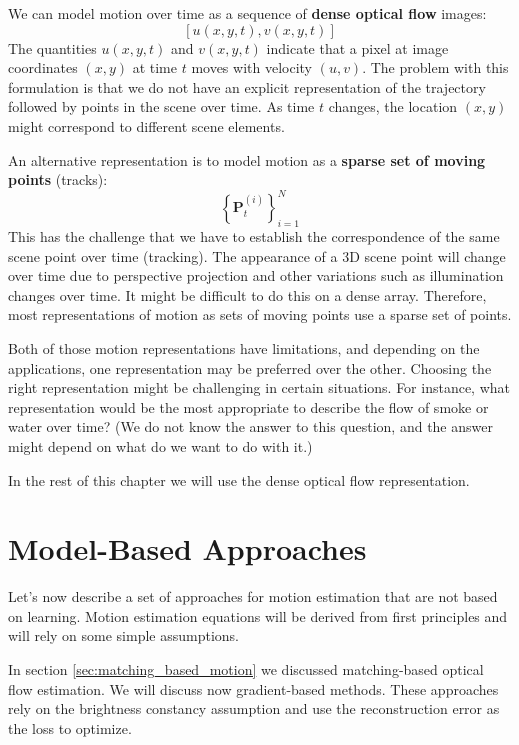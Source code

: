 We can model motion over time as a sequence of {\bf dense optical flow}  images:
\begin{equation}
   \left[ u(x,y,t), v(x,y,t) \right]
\end{equation}
The quantities $u(x,y,t)$ and $v(x,y,t)$ indicate that a pixel at image coordinates $(x,y)$ at time $t$ moves with velocity $(u,v)$. The problem with this formulation is that we do not have an explicit representation of the trajectory followed by points in the scene over time. As time $t$ changes, the location $(x,y)$ might correspond to different scene elements.


An alternative representation is to model motion as a {\bf sparse set of moving points} (tracks): 
\begin{equation}
\left\{ \mathbf{P}^{(i)}_t \right\}_{i=1}^N 
\end{equation}
This has the challenge that we have to establish the correspondence of the same scene point over time (tracking). The appearance of a 3D scene point will change over time due to perspective projection and other variations such as illumination changes over time. It might be difficult to do this on a dense array. Therefore, most representations of motion as sets of moving points use a sparse set of points. 



Both of those motion representations have limitations, and depending on the applications, one representation may be preferred over the other. Choosing the right representation might be challenging in certain situations. For instance, what representation would be the most appropriate to describe the flow of smoke or water over time? (We do not know the answer to this question, and the answer might depend on what do we want to do with it.) 

In the rest of this chapter we will use the dense optical flow representation. 


\section{Model-Based Approaches}

Let's now describe a set of approaches for motion estimation that are not based on learning. Motion estimation equations will be derived from first principles and will rely on some simple assumptions. 

In section \ref{sec:matching_based_motion} we discussed matching-based optical flow estimation. We will discuss now gradient-based methods. These approaches rely on the brightness constancy assumption and use the reconstruction error as the loss to optimize. %




